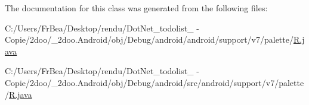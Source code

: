 The documentation for this class was generated from the following files:\begin{CompactItemize}
\item 
C:/Users/FrBea/Desktop/rendu/DotNet\_\-todolist\_ - Copie/2doo/\_\-2doo.Android/obj/Debug/android/android/support/v7/palette/\hyperlink{android_2support_2v7_2palette_2_r_8java}{R.java}\item 
C:/Users/FrBea/Desktop/rendu/DotNet\_\-todolist\_ - Copie/2doo/\_\-2doo.Android/obj/Debug/android/src/android/support/v7/palette/\hyperlink{src_2android_2support_2v7_2palette_2_r_8java}{R.java}\end{CompactItemize}
